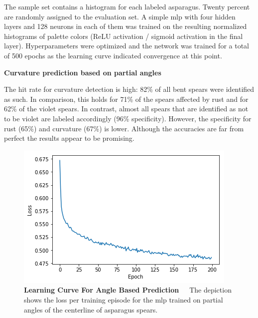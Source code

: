 The sample set contains a histogram for each labeled asparagus. Twenty percent are randomly assigned to the evaluation set. A simple \acrshort{mlp} with four hidden layers and 128 neurons in each of them was trained on the resulting normalized histograms of palette colors (ReLU activation / sigmoid activation in the final layer). Hyperparameters were optimized and the network was trained for a total of 500 epochs as the learning curve indicated convergence at this point.

\bigskip
\textbf{Curvature prediction based on partial angles} 

The hit rate for curvature detection is high: 82\% of all bent spears were identified as such. In comparison, this holds for 71\% of the spears affected by rust and for 62\% of the violet spears. In contrast, almost all spears that are identified as not to be violet are labeled accordingly (96\% specificity). However, the specificity for rust (65\%) and curvature (67\%) is lower. Although the accuracies are far from perfect the results appear to be promising. 

\begin{table}[!h]
	\centering
	\caption[Feature Engineering Curvature Prediction]{\textbf{Curvature Prediction}~~~Performance of curvature prediction based on angles.}
	\label{tab:performance_angle_based}
\end{table}

\begin{figure}[!hb]
	\centering
	\includegraphics[scale=0.7]{Figures/chapter04/fe_curve.png}
	\decoRule
	\caption[Feature Engineering Learning Curve For Angle Based Prediction]{\textbf{Learning Curve For Angle Based Prediction}~~~The depiction shows the loss per training episode for the \acrshort{mlp} trained on partial angles of the centerline of asparagus spears.}
	\label{fig:FeatureEngineeringCurve}
\end{figure}

